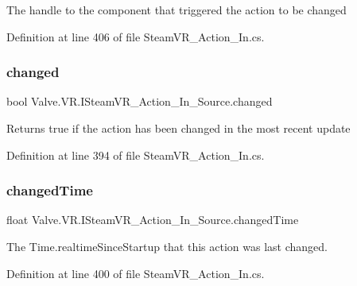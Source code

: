 The handle to the component that triggered the action to be changed 



Definition at line 406 of file Steam\+V\+R\+\_\+\+Action\+\_\+\+In.\+cs.

\mbox{\label{interface_valve_1_1_v_r_1_1_i_steam_v_r___action___in___source_a709444689c4ec680077a341f6cd7b984}} 
\subsubsection{\texorpdfstring{changed}{changed}}
{\footnotesize\ttfamily bool Valve.\+V\+R.\+I\+Steam\+V\+R\+\_\+\+Action\+\_\+\+In\+\_\+\+Source.\+changed\hspace{0.3cm}{\ttfamily [get]}}



Returns true if the action has been changed in the most recent update 



Definition at line 394 of file Steam\+V\+R\+\_\+\+Action\+\_\+\+In.\+cs.

\mbox{\label{interface_valve_1_1_v_r_1_1_i_steam_v_r___action___in___source_a761752bb73a29d2ee597e71a61476c79}} 
\subsubsection{\texorpdfstring{changedTime}{changedTime}}
{\footnotesize\ttfamily float Valve.\+V\+R.\+I\+Steam\+V\+R\+\_\+\+Action\+\_\+\+In\+\_\+\+Source.\+changed\+Time\hspace{0.3cm}{\ttfamily [get]}}



The Time.\+realtime\+Since\+Startup that this action was last changed. 



Definition at line 400 of file Steam\+V\+R\+\_\+\+Action\+\_\+\+In.\+cs.

